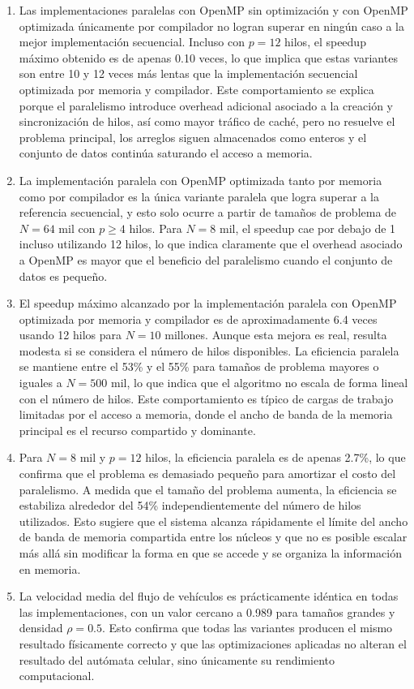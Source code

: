 \begin{enumerate}
\item
Las implementaciones paralelas con OpenMP sin optimización y con OpenMP optimizada únicamente por compilador no logran superar en ningún caso a la mejor implementación secuencial. Incluso con $p=12$ hilos, el speedup máximo obtenido es de apenas 0.10 veces, lo que implica que estas variantes son entre 10 y 12 veces más lentas que la implementación secuencial optimizada por memoria y compilador. Este comportamiento se explica porque el paralelismo introduce overhead adicional asociado a la creación y sincronización de hilos, así como mayor tráfico de caché, pero no resuelve el problema principal, los arreglos siguen almacenados como enteros y el conjunto de datos continúa saturando el acceso a memoria.

\item
La implementación paralela con OpenMP optimizada tanto por memoria como por compilador es la única variante paralela que logra superar a la referencia secuencial, y esto solo ocurre a partir de tamaños de problema de $N=64$ mil con $p \geq 4$ hilos. Para $N=8$ mil, el speedup cae por debajo de 1 incluso utilizando 12 hilos, lo que indica claramente que el overhead asociado a OpenMP es mayor que el beneficio del paralelismo cuando el conjunto de datos es pequeño.

\item
El speedup máximo alcanzado por la implementación paralela con OpenMP optimizada por memoria y compilador es de aproximadamente 6.4 veces usando 12 hilos para $N=10$ millones. Aunque esta mejora es real, resulta modesta si se considera el número de hilos disponibles. La eficiencia paralela se mantiene entre el 53\% y el 55\% para tamaños de problema mayores o iguales a $N=500$ mil, lo que indica que el algoritmo no escala de forma lineal con el número de hilos. Este comportamiento es típico de cargas de trabajo limitadas por el acceso a memoria, donde el ancho de banda de la memoria principal es el recurso compartido y dominante.

\item
Para $N=8$ mil y $p=12$ hilos, la eficiencia paralela es de apenas 2.7\%, lo que confirma que el problema es demasiado pequeño para amortizar el costo del paralelismo. A medida que el tamaño del problema aumenta, la eficiencia se estabiliza alrededor del 54\% independientemente del número de hilos utilizados. Esto sugiere que el sistema alcanza rápidamente el límite del ancho de banda de memoria compartida entre los núcleos y que no es posible escalar más allá sin modificar la forma en que se accede y se organiza la información en memoria.

\item
La velocidad media del flujo de vehículos es prácticamente idéntica en todas las implementaciones, con un valor cercano a 0.989 para tamaños grandes y densidad $\rho = 0.5$. Esto confirma que todas las variantes producen el mismo resultado físicamente correcto y que las optimizaciones aplicadas no alteran el resultado del autómata celular, sino únicamente su rendimiento computacional.
\end{enumerate}

